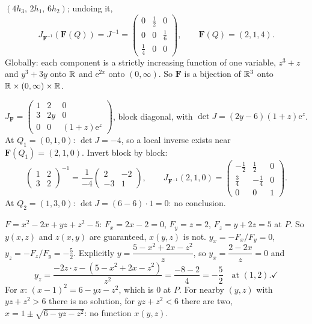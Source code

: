 \begin{solutions}
        $(4h_{3},\,2h_{1},\,6h_{2})$; undoing it,
        \[
          J_{\mathbf{F}^{-1}}(\mathbf{F}(Q))=J^{-1}=\begin{pmatrix}0&\tfrac12&0\\
          0&0&\tfrac16\\\tfrac14&0&0\end{pmatrix},\qquad
          \mathbf{F}(Q)=(2,1,4) .
        \]
        Globally: each component is a strictly increasing function of one
        variable, $z^{3}+z$ and $y^{3}+3y$ onto $\mathbb{R}$ and $\mathrm{e}^{2x}$
        onto $(0,\infty)$. So $\mathbf{F}$ is a bijection of $\mathbb{R}^{3}$ onto
        $\mathbb{R}\times(0,\infty)\times\mathbb{R}$.
  \item $J_{\mathbf{F}}=\begin{pmatrix}1&2&0\\3&2y&0\\0&0&(1+z)\mathrm{e}^{z}
        \end{pmatrix}$, block diagonal, with
        $\det J=(2y-6)(1+z)\mathrm{e}^{z}$. At $Q_{1}=(0,1,0)$: $\det J=-4$,
        so a local inverse exists near $\mathbf{F}(Q_{1})=(2,1,0)$. Invert
        block by block:
        \[
          \begin{pmatrix}1&2\\3&2\end{pmatrix}^{-1}
          =\frac{1}{-4}\begin{pmatrix}2&-2\\-3&1\end{pmatrix},\qquad
          J_{\mathbf{F}^{-1}}(2,1,0)=\begin{pmatrix}-\tfrac12&\tfrac12&0\\
          \tfrac34&-\tfrac14&0\\0&0&1\end{pmatrix} .
        \]
        At $Q_{2}=(1,3,0)$: $\det J=(6-6)\cdot1=0$: no conclusion.
  \item $F=x^{2}-2x+yz+z^{2}-5$: $F_{x}=2x-2=0$, $F_{y}=z=2$,
        $F_{z}=y+2z=5$ at $P$. So $y(x,z)$ and $z(x,y)$ are guaranteed,
        $x(y,z)$ is not. $y_{x}=-F_{x}/F_{y}=0$, $y_{z}=-F_{z}/F_{y}=-\tfrac52$.
        Explicitly $y=\dfrac{5-x^{2}+2x-z^{2}}{z}$, so
        $y_{x}=\dfrac{2-2x}{z}=0$ and
        \[
          y_{z}=\frac{-2z\cdot z-(5-x^{2}+2x-z^{2})}{z^{2}}
               =\frac{-8-2}{4}=-\frac52 \quad\text{at }(1,2). \checkmark
        \]
        For $x$: $(x-1)^{2}=6-yz-z^{2}$, which is $0$ at $P$. For nearby
        $(y,z)$ with $yz+z^{2}>6$ there is no solution, for $yz+z^{2}<6$
        there are two, $x=1\pm\sqrt{6-yz-z^{2}}$: no function $x(y,z)$.

\end{solutions}
